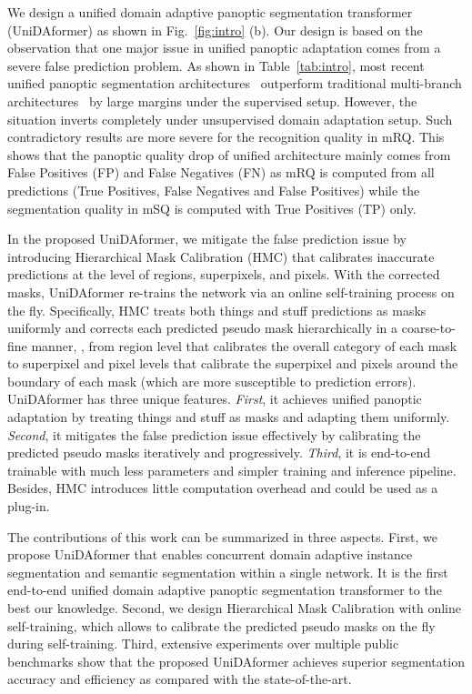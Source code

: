 \documentclass[10pt,twocolumn,letterpaper]{article}
\begin{document}
We design a unified domain adaptive panoptic segmentation transformer (UniDAformer) as shown in Fig.~\ref{fig:intro} (b). Our design is based on the observation that one major issue in unified panoptic adaptation comes from a severe false prediction problem. As shown in Table~\ref{tab:intro}, most recent unified panoptic segmentation architectures~\cite{carion2020detr,li2021fullypanoptic,cheng2021maskformer} outperform traditional multi-branch architectures~\cite{kirillov2019panoptic} by large margins under the supervised setup. However, the situation inverts completely under unsupervised domain adaptation setup.
Such contradictory results are more severe for the recognition quality in mRQ. 
This shows that the panoptic quality drop of unified architecture mainly comes from False Positives (FP) and False Negatives (FN) as mRQ is computed from all predictions (True Positives, False Negatives and False Positives) while the segmentation quality in mSQ is computed with True Positives (TP) only.




In the proposed UniDAformer, we mitigate the false prediction issue by introducing Hierarchical Mask Calibration (HMC) that calibrates inaccurate predictions at the level of regions, superpixels, and pixels. With the corrected masks, UniDAformer re-trains the network via an online self-training process on the fly. Specifically, HMC treats both things and stuff predictions as masks uniformly and corrects each predicted pseudo mask hierarchically in a coarse-to-fine manner, , from region level that calibrates the overall category of each mask to superpixel and pixel levels that calibrate the superpixel and pixels around the boundary of each mask (which are more susceptible to prediction errors).
UniDAformer has three unique features. \textit{First}, it achieves unified panoptic adaptation by treating things and stuff as masks and adapting them uniformly. \textit{Second}, it mitigates the false prediction issue effectively by calibrating the predicted pseudo masks iteratively and progressively. 
\textit{Third}, it is end-to-end trainable with much less parameters and simpler training and inference pipeline.
Besides, HMC introduces little computation overhead and could be used as a plug-in.

The contributions of this work can be summarized in three aspects. First, we propose UniDAformer that enables concurrent domain adaptive instance segmentation and semantic segmentation within a single network. It is the first end-to-end unified domain adaptive panoptic segmentation transformer to the best our knowledge.
Second, we design Hierarchical Mask Calibration with online self-training, which allows to calibrate the predicted pseudo masks on the fly during self-training. 
Third, extensive experiments over multiple public benchmarks show that the proposed UniDAformer achieves superior segmentation accuracy and efficiency as compared with the state-of-the-art.
\end{document}

